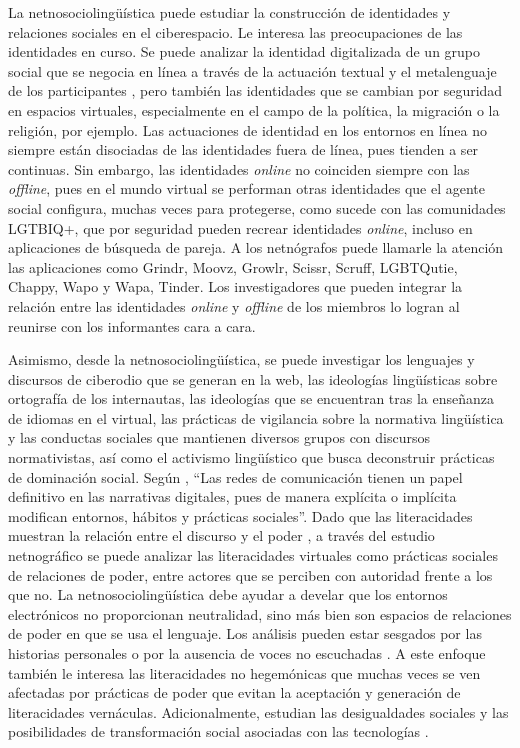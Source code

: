 La netnosociolingüística puede estudiar la construcción de identidades y
relaciones sociales en el ciberespacio. Le interesa las preocupaciones
de las identidades en curso. Se puede analizar la identidad digitalizada
de un grupo social que se negocia en línea a través de la actuación
textual y el metalenguaje de los participantes \cite{campbell2006}, pero
también las identidades que se cambian por seguridad en espacios
virtuales, especialmente en el campo de la política, la migración o la
religión, por ejemplo. Las actuaciones de identidad en los entornos en
línea no siempre están disociadas de las identidades fuera de línea,
pues tienden a ser continuas. Sin embargo, las identidades \emph{online}
no coinciden siempre con las \emph{offline}, pues en el mundo virtual se
performan otras identidades que el agente social configura, muchas veces
para protegerse, como sucede con las comunidades LGTBIQ+, que por
seguridad pueden recrear identidades \emph{online}, incluso en
aplicaciones de búsqueda de pareja. A los netnógrafos puede llamarle la
atención las aplicaciones como Grindr, Moovz, Growlr, Scissr, Scruff,
LGBTQutie, Chappy, Wapo y Wapa, Tinder. Los investigadores que pueden
integrar la relación entre las identidades \emph{online} y
\emph{offline} de los miembros lo logran al reunirse con los informantes
cara a cara.

Asimismo, desde la netnosociolingüística, se puede investigar los
lenguajes y discursos de ciberodio que se generan en la web, las
ideologías lingüísticas sobre ortografía de los internautas, las
ideologías que se encuentran tras la enseñanza de idiomas en el virtual,
las prácticas de vigilancia sobre la normativa lingüística y las
conductas sociales que mantienen diversos grupos con discursos
normativistas, así como el activismo lingüístico que busca deconstruir
prácticas de dominación social. Según \textcite[p. 57]{londoñopalacio2012}, ``Las redes
de comunicación tienen un papel definitivo en las narrativas digitales,
pues de manera explícita o implícita modifican entornos, hábitos y
prácticas sociales''. Dado que las literacidades muestran la relación
entre el discurso y el poder \cite{bloome2005discourse,jimenez2015}, a través del estudio netnográfico se puede analizar las
literacidades virtuales como prácticas sociales de relaciones de poder,
entre actores que se perciben con autoridad frente a los que no. La
netnosociolingüística debe ayudar a develar que los entornos
electrónicos no proporcionan neutralidad, sino más bien son espacios de
relaciones de poder en que se usa el lenguaje. Los análisis pueden estar
sesgados por las historias personales o por la ausencia de voces no
escuchadas \cite{noveli2010}. A este enfoque también le interesa las
literacidades no hegemónicas que muchas veces se ven afectadas por
prácticas de poder que evitan la aceptación y generación de
literacidades vernáculas. Adicionalmente, estudian las desigualdades
sociales y las posibilidades de transformación social asociadas con las
tecnologías \cite{Ardèvol_Lanzeni_2014}.

